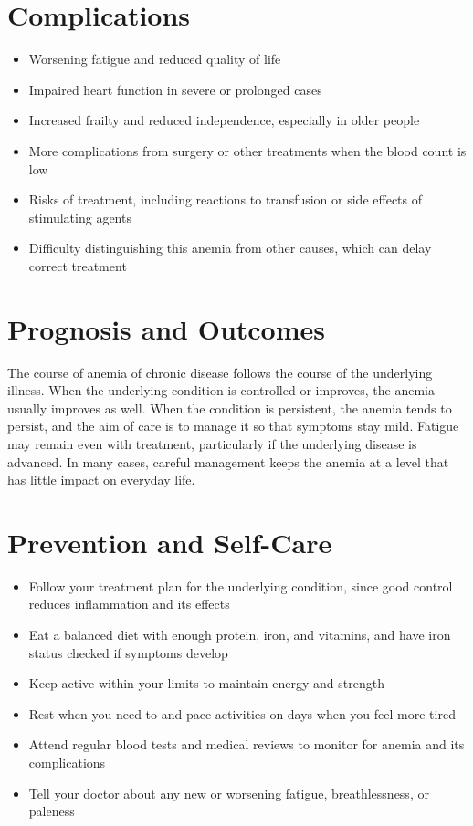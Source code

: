 \section*{Complications}
\begin{itemize}
    \item Worsening fatigue and reduced quality of life
    \item Impaired heart function in severe or prolonged cases
    \item Increased frailty and reduced independence, especially in older people
    \item More complications from surgery or other treatments when the blood count is low
    \item Risks of treatment, including reactions to transfusion or side effects of stimulating agents
    \item Difficulty distinguishing this anemia from other causes, which can delay correct treatment
\end{itemize}

\section*{Prognosis and Outcomes}
The course of anemia of chronic disease follows the course of the underlying illness. When the underlying condition is controlled or improves, the anemia usually improves as well. When the condition is persistent, the anemia tends to persist, and the aim of care is to manage it so that symptoms stay mild. Fatigue may remain even with treatment, particularly if the underlying disease is advanced. In many cases, careful management keeps the anemia at a level that has little impact on everyday life.

\section*{Prevention and Self-Care}
\begin{itemize}
    \item Follow your treatment plan for the underlying condition, since good control reduces inflammation and its effects
    \item Eat a balanced diet with enough protein, iron, and vitamins, and have iron status checked if symptoms develop
    \item Keep active within your limits to maintain energy and strength
    \item Rest when you need to and pace activities on days when you feel more tired
    \item Attend regular blood tests and medical reviews to monitor for anemia and its complications
    \item Tell your doctor about any new or worsening fatigue, breathlessness, or paleness
\end{itemize}

